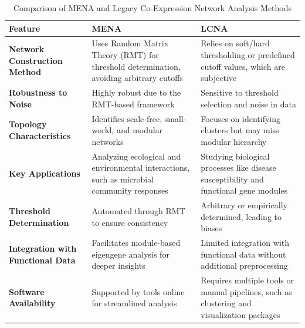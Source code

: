 \begin{table}[H]
\centering
\renewcommand{\arraystretch}{1.5} %
\begin{tabularx}{\textwidth}{@{}p{}X X@{}}
\toprule
\textbf{Feature} & \textbf{MENA} & \textbf{LCNA} \\
\midrule
\textbf{Network Construction Method} &
Uses Random Matrix Theory (RMT) for threshold determination, avoiding arbitrary cutoffs\cite{deng_molecular_2012} &
Relies on soft/hard thresholding or predefined cutoff values, which are subjective\cite{butte_discovering_2000} \\

\textbf{Robustness to Noise} &
Highly robust due to the RMT-based framework\cite{deng_molecular_2012} &
Sensitive to threshold selection and noise in data\cite{deng_molecular_2012} \\

\textbf{Topology Characteristics} &
Identifies scale-free, small-world, and modular networks\cite{deng_molecular_2012} &
Focuses on identifying clusters but may miss modular hierarchy\cite{horvath_analysis_2006} \\

\textbf{Key Applications} &
Analyzing ecological and environmental interactions, such as microbial community responses\cite{deng_molecular_2012} &
Studying biological processes like disease susceptibility and functional gene modules\cite{butte_discovering_2000,zhang_general_2005} \\

\textbf{Threshold Determination} &
Automated through RMT to ensure consistency\cite{deng_molecular_2012} &
Arbitrary or empirically determined, leading to biases\cite{deng_molecular_2012} \\

\textbf{Integration with Functional Data} &
Facilitates module-based eigengene analysis for deeper insights\cite{deng_molecular_2012} &
Limited integration with functional data without additional preprocessing\cite{horvath_analysis_2006} \\

\textbf{Software Availability} &
Supported by tools online for streamlined analysis\cite{deng_molecular_2012} &
Requires multiple tools or manual pipelines, such as clustering and visualization packages\cite{deng_molecular_2012} \\
\bottomrule
\end{tabularx}
\caption{Comparison of MENA and Legacy Co-Expression Network Analysis Methods}
\label{tab:mena_vs_lcna}
\end{table}

